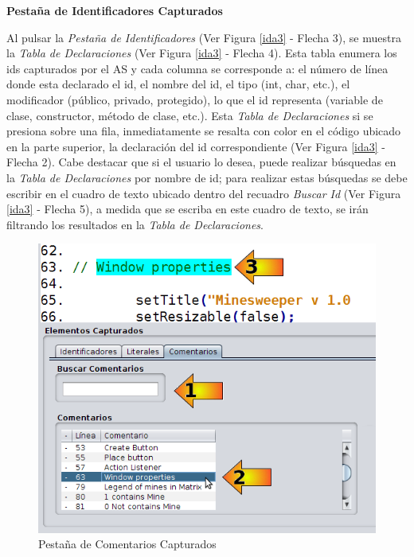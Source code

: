 \noindent \textbf{\\\\\\\\\\Pestaña de Identificadores Capturados\\} 

Al pulsar la \textit{Pestaña de Identificadores} (Ver Figura \ref{ida3} - Flecha 3), se muestra la \textit{Tabla de Declaraciones} (Ver Figura \ref{ida3} - Flecha 4). Esta tabla enumera los ids capturados por el AS y cada columna se corresponde a: el número de línea donde esta declarado el id, el nombre del id, el tipo (int, char, etc.), el modificador (público, privado, protegido), lo que el id representa (variable de clase, constructor, método de clase, etc.).
Esta \textit{Tabla de Declaraciones} si se presiona sobre una fila, inmediatamente se resalta con color en el código ubicado en la parte superior, la declaración del id correspondiente (Ver Figura \ref{ida3} - Flecha 2). 
Cabe destacar que si el usuario lo desea, puede realizar búsquedas en la \textit{Tabla de Declaraciones} por nombre de id; para realizar estas búsquedas se debe escribir en el cuadro de texto ubicado dentro del recuadro \textit{Buscar Id} (Ver Figura \ref{ida3} - Flecha 5), a medida que se escriba en este cuadro de texto, se irán filtrando los resultados en la \textit{Tabla de Declaraciones}.

\begin{figure}[t] %
\centerline{%
\includegraphics[scale= 0.55]{./cap4/ida_05.png}
}
\caption{Pestaña de Comentarios Capturados}
\label{ida5}
\end{figure}

